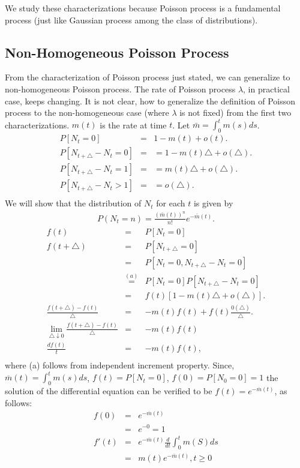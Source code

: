 \documentclass[a4paper,10pt]{article}
\theoremstyle{plain}
\theoremstyle{definition}
\begin{document}
We study these characterizations because Poisson process is a fundamental process (just like Gaussian process among the class of distributions).

\subsection{Non-Homogeneous Poisson Process}
 From the characterization of Poisson process just stated, we can generalize to non-homogeneous Poisson process. The rate of Poisson process $\lambda$, in practical case, keeps changing. It is not clear, how to generalize the definition of Poisson process to the non-homogeneous case (where $\lambda$ is not fixed) from the first two characterizations. $m(t)$ is the rate at time $t$. Let $\bar{m}=\int_{0}^{t}m(s)ds$. 
 \begin{eqnarray*}
 P[N_{t}=0]&=&1-m(t)+o(t). \\
  P[N_{t+\triangle}-N_t=0] &=& =1-m(t)\triangle+o(\triangle). \\
   P[N_{t+\triangle}-N_t=1] &=& = m(t)\triangle+o(\triangle). \\
   P[N_{t+\triangle}-N_t>1] &=& =  o(\triangle). \\
   \end{eqnarray*}
 We will show that the distribution of $N_t$ for each $t$ is given by
 \begin{eqnarray*}
 P(N_t=n)=\frac{(\bar{m}(t))^n}{n!}e^{-\bar{m}(t)}.
 \end{eqnarray*}
\begin{eqnarray*}
  f(t) &=& P[N_{t}=0] \\
  f(t+\triangle) &=& P[N_{t+\triangle}=0] \\
   &=&  P[N_{t}=0, N_{t+\triangle}-N_{t}=0]\\
   &\stackrel{(a)}{=}& P[N_{t}=0] P[N_{t+\triangle}-N_{t}=0]\\
   &=& f(t)[1-m(t)\triangle +o(\triangle)].\\
\frac{f(t+\triangle)-f(t)}{\triangle} &=& -m(t) f(t) +f(t) \frac{0(\triangle)}{\triangle}. \\
  \lim_{\triangle\downarrow 0}\frac{f(t+\triangle)-f(t)}{\triangle} &=& -m(t) f(t) \\
 \frac{d f(t)}{t} &=& -m(t) f(t),  \\
 \end{eqnarray*}
 where (a) follows from independent increment property. Since, $\overline{m}(t)=\int ^{t}_{0} m(s) ds $, $f(t)=P[N_{t}=0]$, $ f(0)=P[N_{0}=0] =1$ the solution of the differential equation can be verified to be $f(t)=e^{-\overline{m}(t)}$, as follows: 
 \begin{eqnarray*}
     f(0)&=& e^{-\overline{m}(t)}\\
  &=& e^{-0}=1 \\
  f'(t) &=& e^{-\overline{m}(t)}\frac{d}{dt} \int^{t}_{0}m(S) ds\\
  &=& m(t)e^{-\overline{m}(t)}, t\geqslant 0 \\
  \end{eqnarray*}
  
\end{document}
